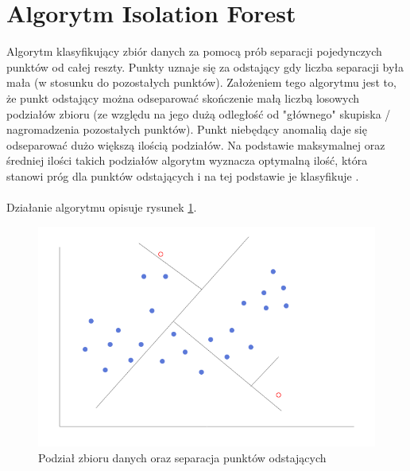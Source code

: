 \documentclass[eng,printmode]{mgr}
\begin{document}
\section{Algorytm Isolation Forest}
\label{sec:if}
Algorytm klasyfikujący zbiór danych za pomocą prób separacji pojedynczych punktów od całej reszty. Punkty uznaje się za odstający gdy liczba separacji była mała (w stosunku do pozostałych punktów). Założeniem tego algorytmu jest to, że punkt odstający można odseparować skończenie małą liczbą losowych podziałów zbioru (ze względu na jego dużą odległość od "głównego" skupiska / nagromadzenia pozostałych punktów). Punkt niebędący anomalią daje się odseparować dużo większą ilością podziałów. Na podstawie maksymalnej oraz średniej ilości takich podziałów algorytm wyznacza optymalną ilość, która stanowi próg dla punktów odstających i na tej podstawie je klasyfikuje \cite{isolation-forest} \cite{isolation-forest-1}.
\\\\
Działanie algorytmu opisuje rysunek \ref{fig:isolation_forest}.

\begin{figure}[H]
  \begin{center}
  \includegraphics[scale=0.7]{isolation_forest}
  \end{center}
  \caption{Podział zbioru danych oraz separacja punktów odstających}
  \label{fig:isolation_forest}
\end{figure}
\end{document}
